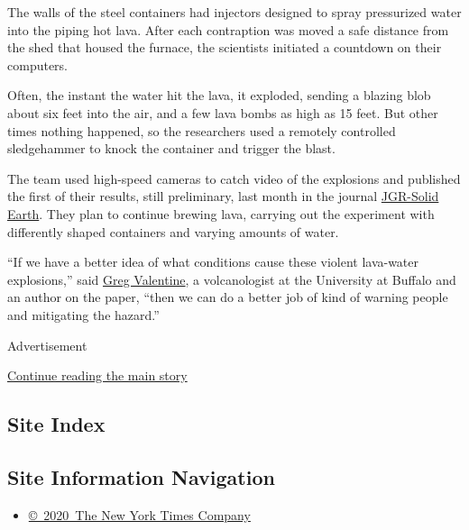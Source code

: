 The walls of the steel containers had injectors designed to spray
pressurized water into the piping hot lava. After each contraption was
moved a safe distance from the shed that housed the furnace, the
scientists initiated a countdown on their computers.

Often, the instant the water hit the lava, it exploded, sending a
blazing blob about six feet into the air, and a few lava bombs as high
as 15 feet. But other times nothing happened, so the researchers used a
remotely controlled sledgehammer to knock the container and trigger the
blast.

The team used high-speed cameras to catch video of the explosions and
published the first of their results, still preliminary, last month in
the journal
\href{https://agupubs.onlinelibrary.wiley.com/doi/10.1029/2018JB015682}{JGR-Solid
Earth}. They plan to continue brewing lava, carrying out the experiment
with differently shaped containers and varying amounts of water.

``If we have a better idea of what conditions cause these violent
lava-water explosions,'' said
\href{http://www.buffalo.edu/news/experts/greg-valentine-faculty-expert-volcanoes.html}{Greg
Valentine}, a volcanologist at the University at Buffalo and an author
on the paper, ``then we can do a better job of kind of warning people
and mitigating the hazard.''

Advertisement

\protect\hyperlink{after-bottom}{Continue reading the main story}

\hypertarget{site-index}{%
\subsection{Site Index}\label{site-index}}

\hypertarget{site-information-navigation}{%
\subsection{Site Information
Navigation}\label{site-information-navigation}}

\begin{itemize}
\tightlist
\item
  \href{https://help.nytimes3xbfgragh.onion/hc/en-us/articles/115014792127-Copyright-notice}{©~2020~The
  New York Times Company}
\end{itemize}

